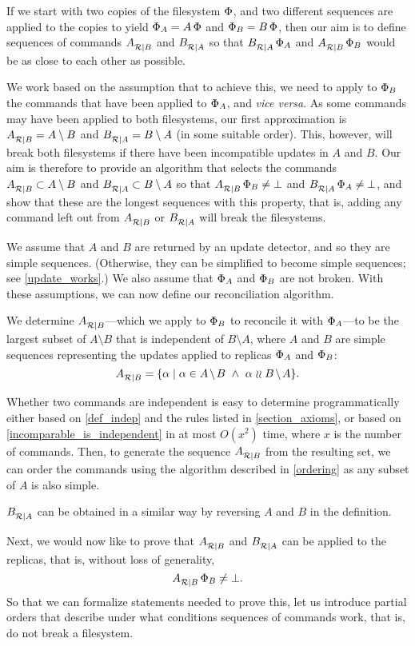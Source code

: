 
If we start with two copies of the filesystem $\Phi$,
and two different sequences are applied to the copies to yield $\Phi_A=A\,\Phi$
and $\Phi_B=B\,\Phi$, then our aim is to define sequences of commands ${A}^{}_{\mathcal{R}|{B}}$ and ${B}^{}_{\mathcal{R}|{A}}$
so that ${B}^{}_{\mathcal{R}|{A}}\,\Phi_A$ and ${A}^{}_{\mathcal{R}|{B}}\,\Phi_B$ would be as close to each other as possible.

We work based on the assumption that to achieve this, we need
to apply to $\Phi_B$ the commands that have been applied to $\Phi_A$, and \emph{vice versa}.
As some commands may have been applied to both filesystems, our first approximation
is ${A}^{}_{\mathcal{R}|{B}} = A\setminus B$ and ${B}^{}_{\mathcal{R}|{A}} = B\setminus A$
(in some suitable order).
This, however, will break both filesystems if there have been incompatible updates
in $A$ and $B$. 
Our aim is therefore to provide an algorithm that selects the commands 
${A}^{}_{\mathcal{R}|{B}} \subset A\setminus B$
and ${B}^{}_{\mathcal{R}|{A}} \subset B\setminus A$ 
so that ${A}^{}_{\mathcal{R}|{B}}\,\Phi_B\neq\bot$ and ${B}^{}_{\mathcal{R}|{A}}\,\Phi_A\neq\bot$,
and show that these are the longest sequences with this property, that is,
adding any command left out from ${A}^{}_{\mathcal{R}|{B}}$ or ${B}^{}_{\mathcal{R}|{A}}$ will break the filesystems.

We assume that $A$ and $B$ are returned by an update detector,
and so they are simple sequences.
(Otherwise, they can be simplified to become simple sequences; see \cref{update_works}.)
We also assume that $\Phi_A$ and $\Phi_B$ are not broken.
With these assumptions,
we can now define our reconciliation algorithm.

\begin{mydef}[Reconciliation]\label{def:reconciliation}
We determine ${A}^{}_{\mathcal{R}|{B}}$---which we apply to $\Phi_B$ 
to reconcile it with $\Phi_A$---to be
the largest subset of $A\setminus B$
that is independent of $B\setminus A$,
where $A$ and $B$ are simple sequences representing
the updates applied to replicas $\Phi_A$ and $\Phi_B$:
\[ \reca = \{\alpha \whr \alpha\in \ambnp  \ \wedge\   \alpha\indep \bmanp \}. \]
\end{mydef}

Whether two commands are independent is easy to determine programmatically
either based on \cref{def_indep} and the rules listed in \cref{section_axioms},
or based on \cref{incomparable_is_independent} 
in at most $O(x^2)$ time, where $x$ is the number of commands.
Then, to generate the sequence ${A}^{}_{\mathcal{R}|{B}}$ from the resulting set, 
we can order the commands using the algorithm described in
\cref{ordering} as any subset of $A$ is also simple.

${B}^{}_{\mathcal{R}|{A}}$ can be obtained in a similar way by reversing $A$ and $B$
in the definition.

\bigskip

\noindent
Next, we would now like to prove that ${A}^{}_{\mathcal{R}|{B}}$ and ${B}^{}_{\mathcal{R}|{A}}$ can be applied to the replicas,
that is, without loss of generality,
\[ {A}^{}_{\mathcal{R}|{B}}\,\Phi_B\neq\bot. \]
So that we can formalize statements needed to prove this,
let us introduce partial orders that describe under what conditions
sequences of commands work, that is, do not break a filesystem.
